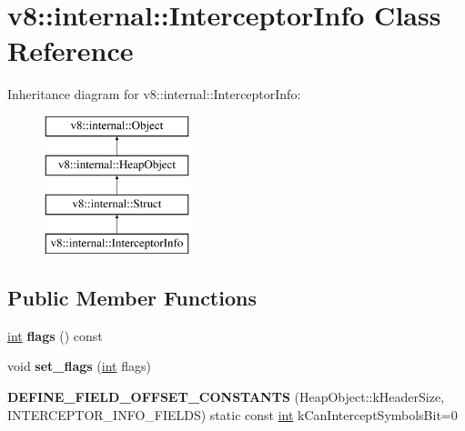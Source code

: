 \hypertarget{classv8_1_1internal_1_1InterceptorInfo}{}\section{v8\+:\+:internal\+:\+:Interceptor\+Info Class Reference}
\label{classv8_1_1internal_1_1InterceptorInfo}
Inheritance diagram for v8\+:\+:internal\+:\+:Interceptor\+Info\+:\begin{figure}[H]
\begin{center}
\leavevmode
\includegraphics[height=4.000000cm]{classv8_1_1internal_1_1InterceptorInfo}
\end{center}
\end{figure}
\subsection*{Public Member Functions}
\begin{DoxyCompactItemize}
\item 
\mbox{\label{classv8_1_1internal_1_1InterceptorInfo_a3c59e8c69d55ecb177c9e41ea52ebad3}} 
\mbox{\hyperlink{classint}{int}} {\bfseries flags} () const
\item 
\mbox{\label{classv8_1_1internal_1_1InterceptorInfo_a80e31ead607eb711c56310bfa131a87b}} 
void {\bfseries set\+\_\+flags} (\mbox{\hyperlink{classint}{int}} flags)
\item 
\mbox{\label{classv8_1_1internal_1_1InterceptorInfo_a98abe1d6a9e627d8fb3a937ad9a93c60}} 
{\bfseries D\+E\+F\+I\+N\+E\+\_\+\+F\+I\+E\+L\+D\+\_\+\+O\+F\+F\+S\+E\+T\+\_\+\+C\+O\+N\+S\+T\+A\+N\+TS} (Heap\+Object\+::k\+Header\+Size, I\+N\+T\+E\+R\+C\+E\+P\+T\+O\+R\+\_\+\+I\+N\+F\+O\+\_\+\+F\+I\+E\+L\+DS) static const \mbox{\hyperlink{classint}{int}} k\+Can\+Intercept\+Symbols\+Bit=0
\end{DoxyCompactItemize}
